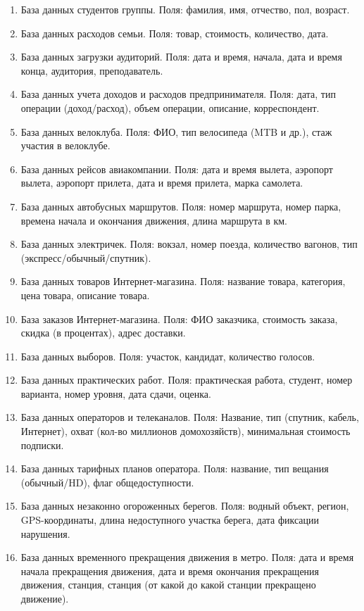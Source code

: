 \begin{enumerate}
	\item База данных студентов группы. Поля: фамилия, имя, отчество, пол, возраст. 
	\item База данных расходов семьи. Поля: товар, стоимость, количество, дата.
	\item База данных загрузки аудиторий. Поля: дата и время, начала, дата и время конца, аудитория, преподаватель. 
	\item База данных учета доходов и расходов предпринимателя. Поля: дата, тип операции (доход/расход), объем операции, описание, 
корреспондент. 
	\item База данных велоклуба. Поля: ФИО, тип велосипеда (MTB и др.), стаж участия в велоклубе.
	\item База данных рейсов авиакомпании. Поля: дата и время вылета, аэропорт вылета, аэропорт прилета, дата и время прилета, 
марка самолета.
	\item База данных автобусных маршрутов. Поля: номер маршрута, номер парка, времена начала и окончания движения,
длина маршрута в км. 
	\item База данных электричек. Поля: вокзал, номер поезда, количество вагонов, тип (экспресс/обычный/спутник).
	\item База данных товаров Интернет-магазина. Поля: название товара, категория, цена товара, описание товара. 
	\item База заказов Интернет-магазина. Поля: ФИО заказчика, стоимость заказа, скидка (в процентах), адрес доставки. 
	\item База данных выборов. Поля: участок, кандидат, количество голосов.
	\item База данных практических работ. Поля: практическая работа, студент, номер варианта, номер уровня, 
дата сдачи, оценка. 
	\item База данных операторов и телеканалов. Поля: Название, тип (спутник, кабель, Интернет), охват (кол-во миллионов домохозяйств), минимальная
стоимость подписки. 
	\item База данных тарифных планов оператора. Поля: название, тип вещания (обычный/HD), флаг общедоступности. 
	\item База данных незаконно огороженных берегов. Поля: водный объект, регион, GPS-координаты, длина недоступного участка берега, дата фиксации нарушения.
	\item База данных временного прекращения движения в метро. Поля: дата и время начала прекращения
движения, дата и время окончания прекращения движения, станция, станция (от какой до какой станции прекращено движение).

\end{enumerate}
